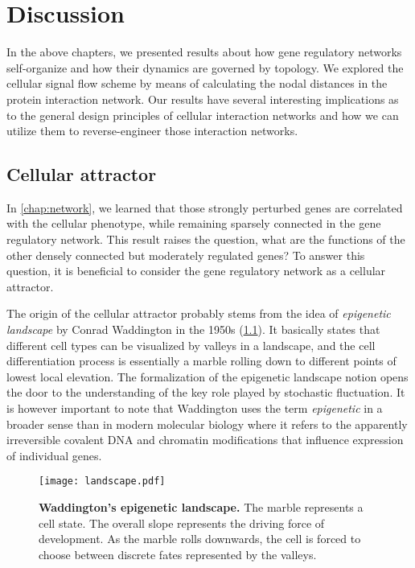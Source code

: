\chapter{Discussion}
In the above chapters, we presented results about how gene regulatory networks
self-organize and how their dynamics are governed by topology. We explored
the cellular signal flow scheme by means of calculating the nodal distances in
the protein interaction network. Our results have several interesting implications
as to the general design principles of cellular interaction networks and
how we can utilize them to reverse-engineer those interaction networks.

\section{Cellular attractor}
In \ref{chap:network}, we learned that those strongly perturbed genes are
correlated with the cellular phenotype, while remaining sparsely connected in
the gene regulatory network. This result raises the question, what are the
functions of the other densely connected but moderately regulated genes? 
To answer this question, it is beneficial to consider the gene regulatory network
as a cellular attractor.

The origin of the cellular attractor probably stems from the idea of 
\emph{epigenetic landscape} by Conrad Waddington in the 1950s 
(\ref{fig:landscape}). It basically
states that different cell types can be visualized by valleys in a landscape,
and the cell differentiation process is essentially a marble rolling down to
different points of lowest local elevation. The formalization of the epigenetic landscape notion opens the door to the understanding of the key role played by stochastic fluctuation. 
It is however important to note that Waddington uses the term \emph{epigenetic} in a broader sense than in modern molecular biology where it refers to the apparently irreversible covalent DNA and chromatin modifications that influence expression of individual genes.

\begin{figure}[!ht]
\begin{center}
\texttt{[image: landscape.pdf]}
\end{center}
\caption[Waddington's epigenetic landscape]{
{\bf Waddington's epigenetic landscape.}
The marble represents a cell state. The overall slope represents the driving force of development. As the marble rolls downwards, the cell is forced to choose between discrete fates represented by the valleys.
}
\label{fig:landscape}
\end{figure}


